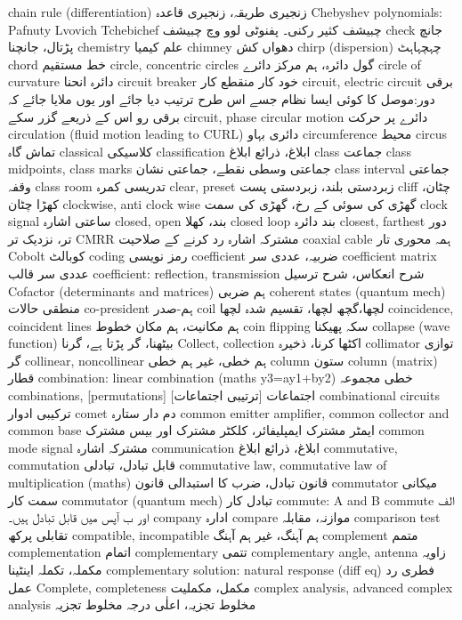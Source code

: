 chain rule (differentiation)	زنجیری طریقہ، زنجیری قاعدہ
Chebyshev polynomials: Pafnuty Lvovich Tchebichef	چبیشف کثیر رکنی۔ پفنوٹی لوو وچ چبیشف
check	جانچ پڑتال، جانچنا
chemistry	علم کیمیا
chimney	دھواں کش
chirp (dispersion)	چہچہاہٹ
chord	خط مستقیم
circle, concentric circles	گول دائرہ، ہم مرکز دائرے
circle of curvature	دائرہ انحنا
circuit breaker	خود کار منقطع کار
circuit,  electric circuit	برقی دور:موصل کا کوئی ایسا نظام جسے اس طرح ترتیب دیا جائے اور یوں ملایا جائے کہ برقی رو اس کے ذریعے گزر سکے 
circuit, phase	
circular motion	دائرے پر حرکت
circulation (fluid motion leading to CURL)	دائری بہاو
circumference	محیط
circus	تماش گاہ
classical	کلاسیکی
classification	 ابلاغ، ذرائع ابلاغ
class	جماعت
class midpoints, class marks	جماعتی وسطی نقطے، جماعتی نشان
class interval	جماعتی وقفہ
class room	تدریسی کمرہ
clear, preset	زبردستی بلند، زبردستی پست
cliff	چٹان، کھڑا چٹان
clockwise, anti clock wise	گھڑی کی سوئی کے رخ، گھڑی کی سمت
clock signal	ساعتی اشارہ
closed, open	بند، کھلا
closed loop	بند دائرہ
closest, farthest	دور تر، نزدیک تر
CMRR	مشترکہ اشارہ رد کرنے کے صلاحیت
coaxial cable	ہمہ محوری تار
Cobolt	کوبالٹ
coding	رمز نویسی
coefficient	ضربیہ، عددی سر
coefficient matrix	عددی سر قالب
coefficient: reflection, transmission	شرح انعکاس، شرح ترسیل
Cofactor (determinants and matrices)	ہم ضربی
coherent states (quantum mech)	منطقی حالات
co-president	ہم-صدر
coil	لچھا،گچھ لچھا، تقسیم شدہ لچھا
coincidence, coincident lines	ہم مکانیت، ہم مکان خطوط
coin flipping	سکہ پھیکنا
collapse (wave function)	بیٹھنا، گر پڑتا ہے، گرنا
Collect, collection	اکٹھا کرنا، ذخیرہ
collimator	توازی گر
collinear, noncollinear	ہم خطی، غیر ہم خطی
column	ستون
column (matrix)	قطار
combination: linear combination (maths y3=ay1+by2)	خطی مجموعہ
combinations, [permutations]	اجتماعات [ترتیبی اجتماعات]
combinational circuits	ترکیبی ادوار
comet	دم دار ستارہ
common emitter amplifier, common collector and common base	ایمٹر مشترک ایمپلیفائر، کلکٹر مشترک اور بیس مشترک
common mode signal	مشترکہ اشارہ
communication	 ابلاغ، ذرائع ابلاغ
commutative, commutation	قابل تبادل، تبادلی
commutative law, commutative law of multiplication (maths)	قانون تبادل، ضرب کا استبدالی قانون
commutator	میکانی سمت کار
commutator (quantum mech)	تبادل کار
commute: A and B commute	الف اور ب آپس میں قابل تبادل ہیں۔
company	ادارہ
compare	موازنہ، مقابلہ
comparison test	تقابلی پرکھ
compatible, incompatible	ہم آہنگ، غیر ہم آہنگ
complement	متمم
complementation	اتمام
complementary	تتمی
complementary angle, antenna	زاویہ مکملہ، تکملہ اینٹینا
complementary solution: natural response (diff eq)	فطری رد عمل
Complete, completeness	مکمل، مکملیت
complex analysis, advanced complex analysis	مخلوط تجزیہ، اعلٰی درجہ مخلوط تجزیہ
